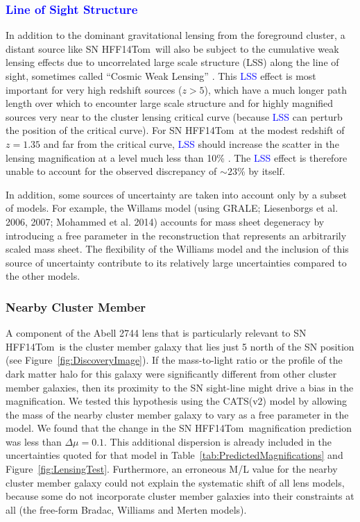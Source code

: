 \documentclass[iop]{emulateapj}
\newcommand{\change}[1]{{ \textcolor{blue}{#1}}}
\newcommand{\change}[1]{#1}
\def\tomas{HFF14Tom}
\begin{document}
\change{\subsubsection{Line of Sight Structure}}
In addition to the dominant gravitational lensing from the foreground
cluster, a distant source like SN \tomas\ will also be subject to the
cumulative weak lensing effects due to uncorrelated large scale
structure (LSS) along the line of sight, sometimes called ``Cosmic
Weak
Lensing'' \citep{Wong:2011,Host:2012,Collett:2013,Greene:2013,Bayliss:2014,McCully:2014,DAloisio:2014}.
This \change{LSS} effect is most important for very high redshift
sources ($z>5$), which have a much longer path length over which to
encounter large scale structure and for highly magnified sources very
near to the cluster lensing critical curve (because \change{LSS} can
perturb the position of the critical curve).  For SN \tomas\ at the
modest redshift of $z=1.35$ and far from the critical
curve, \change{LSS} should increase the scatter in the lensing
magnification at a level much less than 10\% \citep{DAloisio:2014}.
The \change{LSS} effect is therefore unable to account for the
observed discrepancy of $\sim23$\% by itself.

In addition, some sources of uncertainty are taken into account only by a
subset of models. For example, the Willams model (using GRALE;
Liesenborgs et al. 2006, 2007; Mohammed et al. 2014) accounts for mass
sheet degeneracy by introducing a free parameter in the reconstruction
that represents an arbitrarily scaled mass sheet. The flexibility of
the Williams model and the inclusion of this source of uncertainty
contribute to its relatively large uncertainties compared to the other
models.

\subsubsection{Nearby Cluster Member}
A component of the Abell 2744 lens that is particularly relevant to SN \tomas\ is the cluster member
galaxy that lies just 5 north of the SN position (see
Figure~\ref{fig:DiscoveryImage}).  If the mass-to-light ratio or the
profile of the dark matter halo for this galaxy were significantly
different from other cluster member galaxies, then its
proximity to the SN sight-line might drive a bias in the magnification.
We tested this hypothesis using the CATS(v2) model by allowing the mass
of the nearby cluster member galaxy to vary as a free parameter in the
model. We found that the change in the SN \tomas\ magnification
prediction was less than $\Delta\mu=0.1$.  This additional dispersion
is already included in the uncertainties quoted for that model in
Table~\ref{tab:PredictedMagnifications} and
Figure~\ref{fig:LensingTest}.  Furthermore, an erroneous M/L
value for the nearby cluster member galaxy could not explain the
systematic shift of all lens models, because some do not incorporate
cluster member galaxies into their constraints at all (the free-form
Bradac, Williams and Merten models).
\end{document}

